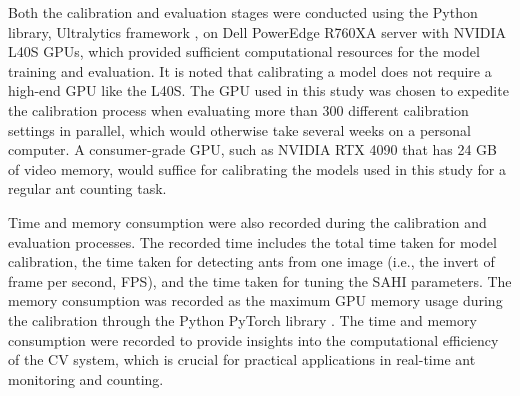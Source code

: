 Both the calibration and evaluation stages were conducted using the Python library, Ultralytics framework \cite{jocher_yolo_2023}, on Dell PowerEdge R760XA server with NVIDIA L40S GPUs, which provided sufficient computational resources for the model training and evaluation. It is noted that calibrating a model does not require a high-end GPU like the L40S. The GPU used in this study was chosen to expedite the calibration process when evaluating more than 300 different calibration settings in parallel, which would otherwise take several weeks on a personal computer. A consumer-grade GPU, such as NVIDIA RTX 4090 that has 24 GB of video memory, would suffice for calibrating the models used in this study for a regular ant counting task.

Time and memory consumption were also recorded during the calibration and evaluation processes. The recorded time includes the total time taken for model calibration, the time taken for detecting ants from one image (i.e., the invert of frame per second, FPS), and the time taken for tuning the SAHI parameters. The memory consumption was recorded as the maximum GPU memory usage during the calibration through the Python PyTorch library \cite{paszke_pytorch_2019}. The time and memory consumption were recorded to provide insights into the computational efficiency of the CV system, which is crucial for practical applications in real-time ant monitoring and counting.

